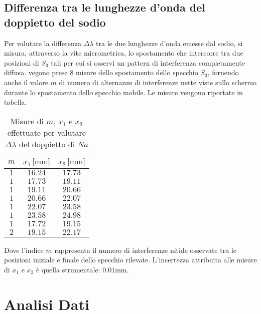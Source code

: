 \documentclass[]{article}
\let\oldsection\section%
\renewcommand{\section}{%
	\renewcommand{\theequation}{\thesection.\arabic{equation}}%
	\oldsection}%
\let\oldsubsection\subsection%
\renewcommand{\subsection}{%
	\renewcommand{\theequation}{\thesubsection.\arabic{equation}}%
	\oldsubsection}%
\begin{document}
\subsection{Differenza tra le lunghezze d'onda del doppietto del sodio}

Per valutare la differenza $\Delta \lambda$ tra le due lunghezze d'onda emesse dal sodio, si misura, attraverso la vite micrometrica, lo spostamento che intercorre tra due posizioni di $S_3$ tali per cui si osservi un pattern di interferenza completamente diffusa. 
vegono prese 8 misure dello spostamento dello specchio $S_3$, fornendo anche il valore $m$ di numero di alternanze di interferenze nette viste sullo schermo durante lo spostamento dello specchio mobile. Le misure vengono riportate in tabella.

\begin{table}[H]
    \centering

    \begin{tabular}{||c|c|c||}
        \hline
        $m $ & $x_1 \, \text{[mm]}$ & $x_2\, \text{[mm]}$ \\
        \hline\hline

        $1$ & $16.24$ & $17.73$ \\\hline
        $1$ & $17.73$ & $19.11$ \\\hline
        $1$ & $19.11$ & $20.66$ \\\hline
        $1$ & $20.66$ & $22.07$ \\\hline
        $1$ & $22.07$ & $23.58$ \\\hline
        $1$ & $23.58$ & $24.98$ \\\hline
        $1$ & $17.72$ & $19.15$ \\\hline
        $2$ & $19.15$ & $22.17$ \\\hline
    
    \end{tabular}
    \caption{Misure di $m$, $x_1$ e $x_2$ effettuate per valutare $\Delta \lambda$ del doppietto di $Na$ }
    \label{sodio}    
\end{table}
Dove l'indice $m$ rappresenta il numero di interferenze nitide osservate tra le posizioni iniziale e finale dello specchio rilevate. L'incertezza attribuita alle misure di $x_1$ e $x_2$ è quella strumentale: $0.01 \text{mm}$.


\section{Analisi Dati}
\end{document}
